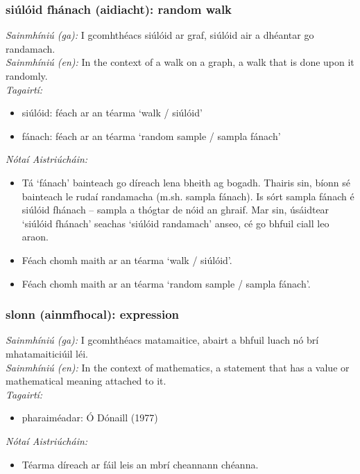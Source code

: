 \subsubsection*{siúlóid fhánach (aidiacht): random walk}
 \noindent \textit{Sainmhíniú (ga):} I gcomhthéacs siúlóid ar graf, siúlóid air a dhéantar go randamach.
\\
 \noindent \textit{Sainmhíniú (en):} In the context of a walk on a graph, a walk that is done upon it randomly.
\\
 \noindent \textit{Tagairtí:}
\begin{itemize}
	\item siúlóid: féach ar an téarma `walk / siúlóid'
	\item fánach: féach ar an téarma `random sample / sampla fánach'
\end{itemize}

 \noindent \textit{Nótaí Aistriúcháin:}
\begin{itemize}
	\item Tá `fánach' bainteach go díreach lena bheith ag bogadh. Thairis sin, bíonn sé bainteach le rudaí randamacha (m.sh. sampla fánach). Is sórt sampla fánach é siúlóid fhánach -- sampla a thógtar de nóid an ghraif. Mar sin, úsáidtear `siúlóid fhánach' seachas `siúlóid randamach' anseo, cé go bhfuil ciall leo araon.
	\item Féach chomh maith ar an téarma `walk / siúlóid'.
	\item Féach chomh maith ar an téarma `random sample / sampla fánach'.
\end{itemize}


\subsubsection*{slonn (ainmfhocal): expression}
 \noindent \textit{Sainmhíniú (ga):} I gcomhthéacs matamaitice, abairt a bhfuil luach nó brí mhatamaiticiúil léi.
\\
 \noindent \textit{Sainmhíniú (en):} In the context of mathematics, a statement that has a value or mathematical meaning attached to it.
\\
 \noindent \textit{Tagairtí:}
\begin{itemize}
	\item pharaiméadar: Ó Dónaill (1977) \cite{odonaill}
\end{itemize}

 \noindent \textit{Nótaí Aistriúcháin:}
\begin{itemize}
	\item Téarma díreach ar fáil leis an mbrí cheannann chéanna.
\end{itemize}



